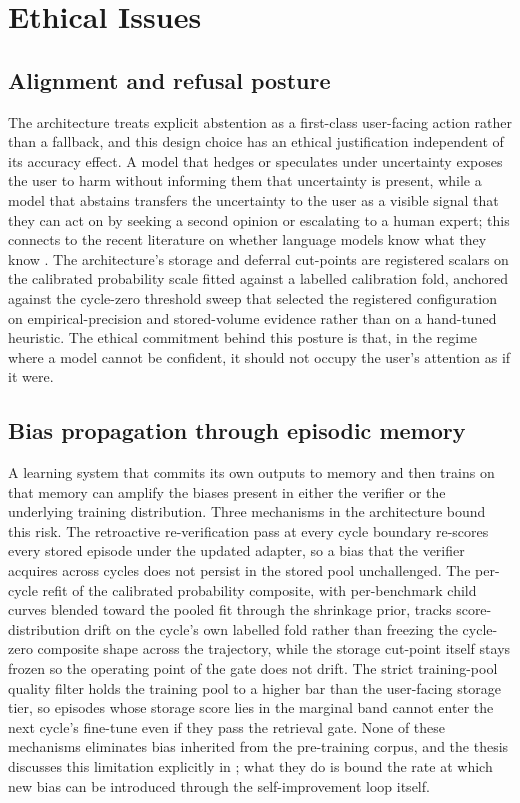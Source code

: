 \section{Ethical Issues}
\label{sec:ethics}

\subsection{Alignment and refusal posture}
\label{sec:ethics-alignment}

The architecture treats explicit abstention as a first-class user-facing action rather than a fallback, and this design choice has an ethical justification independent of its accuracy effect. A model that hedges or speculates under uncertainty exposes the user to harm without informing them that uncertainty is present, while a model that abstains transfers the uncertainty to the user as a visible signal that they can act on by seeking a second opinion or escalating to a human expert; this connects to the recent literature on whether language models know what they know \cite{kadavath2022language}. The architecture's storage and deferral cut-points are registered scalars on the calibrated probability scale fitted against a labelled calibration fold, anchored against the cycle-zero threshold sweep that selected the registered configuration on empirical-precision and stored-volume evidence rather than on a hand-tuned heuristic. The ethical commitment behind this posture is that, in the regime where a model cannot be confident, it should not occupy the user's attention as if it were.

\subsection{Bias propagation through episodic memory}
\label{sec:ethics-bias}

A learning system that commits its own outputs to memory and then trains on that memory can amplify the biases present in either the verifier or the underlying training distribution. Three mechanisms in the architecture bound this risk. The retroactive re-verification pass at every cycle boundary re-scores every stored episode under the updated adapter, so a bias that the verifier acquires across cycles does not persist in the stored pool unchallenged. The per-cycle refit of the calibrated probability composite, with per-benchmark child curves blended toward the pooled fit through the shrinkage prior, tracks score-distribution drift on the cycle's own labelled fold rather than freezing the cycle-zero composite shape across the trajectory, while the storage cut-point itself stays frozen so the operating point of the gate does not drift. The strict training-pool quality filter holds the training pool to a higher bar than the user-facing storage tier, so episodes whose storage score lies in the marginal band cannot enter the next cycle's fine-tune even if they pass the retrieval gate. None of these mechanisms eliminates bias inherited from the pre-training corpus, and the thesis discusses this limitation explicitly in ; what they do is bound the rate at which new bias can be introduced through the self-improvement loop itself.

